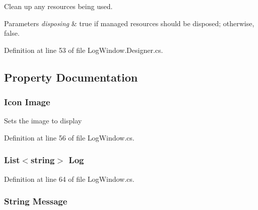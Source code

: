 Clean up any resources being used. 


\begin{DoxyParams}{Parameters}
{\em disposing} & true if managed resources should be disposed; otherwise, false.\\
\hline
\end{DoxyParams}


Definition at line 53 of file Log\+Window.\+Designer.\+cs.



\subsection{Property Documentation}
\hypertarget{class_m_p_f_s21_1_1_log_window_a486ada6aa6732a5d569ae1cda3d7b429}{}
\subsubsection[{Image}]{\setlength{\rightskip}{0pt plus 5cm}Icon Image\hspace{0.3cm}{\ttfamily [set]}}\label{class_m_p_f_s21_1_1_log_window_a486ada6aa6732a5d569ae1cda3d7b429}


Sets the image to display 



Definition at line 56 of file Log\+Window.\+cs.

\hypertarget{class_m_p_f_s21_1_1_log_window_a06712a1c8dec792865a961869c7acf59}{}
\subsubsection[{Log}]{\setlength{\rightskip}{0pt plus 5cm}List$<$string$>$ Log\hspace{0.3cm}{\ttfamily [set]}}\label{class_m_p_f_s21_1_1_log_window_a06712a1c8dec792865a961869c7acf59}


Definition at line 64 of file Log\+Window.\+cs.

\hypertarget{class_m_p_f_s21_1_1_log_window_a511236ef77d83eeff6ae4e6ae198b451}{}
\subsubsection[{Message}]{\setlength{\rightskip}{0pt plus 5cm}String Message\hspace{0.3cm}{\ttfamily [set]}}\label{class_m_p_f_s21_1_1_log_window_a511236ef77d83eeff6ae4e6ae198b451}


